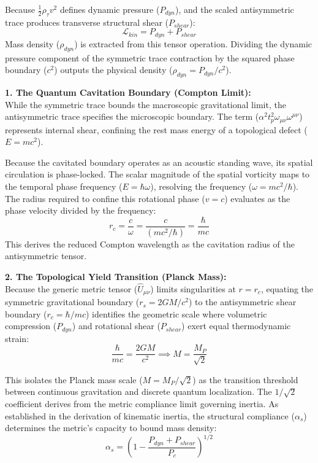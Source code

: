 Because $\frac{1}{2}\rho_\tau v^2$ defines dynamic pressure ($P_{dyn}$), and the scaled antisymmetric trace produces transverse structural shear ($P_{shear}$): 
\begin{equation}
    \mathcal{L}_{kin} = P_{dyn} + P_{shear} \label{eq:kinematic_lagrangian_trace}
\end{equation}
Mass density ($\rho_{dyn}$) is extracted from this tensor operation. Dividing the dynamic pressure component of the symmetric trace contraction by the squared phase boundary ($c^2$) outputs the physical density ($\rho_{dyn} = P_{dyn}/c^2$).

\textbf{1. The Quantum Cavitation Boundary (Compton Limit):} \\
While the symmetric trace bounds the macroscopic gravitational limit, the antisymmetric trace specifies the microscopic boundary. The term ($\alpha^2 t_p^2 \omega_{\mu\nu}\omega^{\mu\nu}$) represents internal shear, confining the rest mass energy of a topological defect ($E = mc^2$). 

Because the cavitated boundary operates as an acoustic standing wave, its spatial circulation is phase-locked. The scalar magnitude of the spatial vorticity maps to the temporal phase frequency ($E = \hbar \omega$), resolving the frequency ($\omega = mc^2/\hbar$). The radius required to confine this rotational phase ($v = c$) evaluates as the phase velocity divided by the frequency: 
\begin{equation}
    r_c = \frac{c}{\omega} = \frac{c}{(mc^2/\hbar)} = \frac{\hbar}{mc}
\end{equation}
This derives the reduced Compton wavelength as the cavitation radius of the antisymmetric tensor. 

\textbf{2. The Topological Yield Transition (Planck Mass):} \\ 
Because the generic metric tensor ($\hat{U}_{\mu\nu}$) limits singularities at $r = r_c$, equating the symmetric gravitational boundary ($r_s = 2GM/c^2$) to the antisymmetric shear boundary ($r_c = \hbar/mc$) identifies the geometric scale where volumetric compression ($P_{dyn}$) and rotational shear ($P_{shear}$) exert equal thermodynamic strain: 
\begin{equation}
    \frac{\hbar}{mc} = \frac{2GM}{c^2} \implies M = \frac{M_P}{\sqrt{2}}
\end{equation}

This isolates the Planck mass scale ($M = M_P / \sqrt{2}$) as the transition threshold between continuous gravitation and discrete quantum localization. The $1/\sqrt{2}$ coefficient derives from the metric compliance limit governing inertia. As established in the derivation of kinematic inertia, the structural compliance ($\alpha_s$) determines the metric's capacity to bound mass density:
\begin{equation}
    \alpha_s = \left( 1 - \frac{P_{dyn} + P_{shear}}{P_c} \right)^{1/2}
\end{equation}

